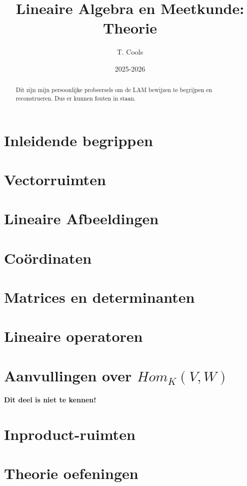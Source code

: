 \documentclass[a4paper,twoside]{article}
\title{Lineaire Algebra en Meetkunde: Theorie}
\author{T. Cools}
\date{2025-2026}
\theoremstyle{definition}
\theoremstyle{plain}
\begin{document}
\maketitle

\begin{abstract}
    Dit zijn mijn persoonlijke probeersels om de LAM bewijzen te begrijpen en reconstrueren.
    Dus er kunnen fouten in staan.        
    
\end{abstract}


\section{Inleidende begrippen}

\section{Vectorruimten}

\section{Lineaire Afbeeldingen}

\section{Coördinaten}

\section{Matrices en determinanten}

\section{Lineaire operatoren}


\section{Aanvullingen over \(Hom_K(V,W)\)}
\textbf{Dit deel is niet te kennen!}
\section{Inproduct-ruimten}

\section{Theorie oefeningen}

\end{document}
